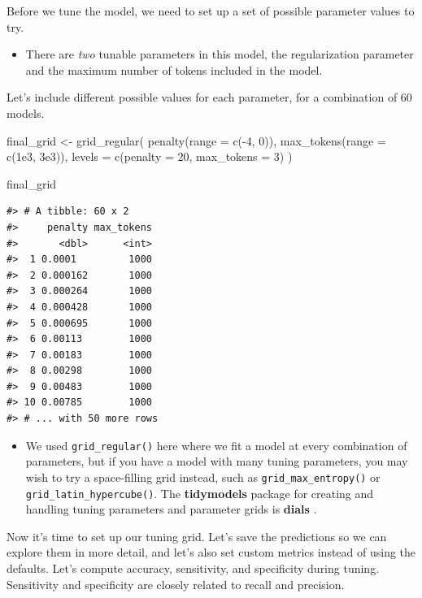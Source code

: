 \documentclass[
]{krantz}
\makeatletter
\newenvironment{Shaded}{\begin{snugshade}}{\end{snugshade}}
\newcommand{\AttributeTok}[1]{\textcolor[rgb]{0.77,0.63,0.00}{#1}}
\newcommand{\DecValTok}[1]{\textcolor[rgb]{0.00,0.00,0.81}{#1}}
\newcommand{\FloatTok}[1]{\textcolor[rgb]{0.00,0.00,0.81}{#1}}
\newcommand{\FunctionTok}[1]{\textcolor[rgb]{0.00,0.00,0.00}{#1}}
\newcommand{\NormalTok}[1]{#1}
\newcommand{\OtherTok}[1]{\textcolor[rgb]{0.56,0.35,0.01}{#1}}
\newcommand{\SpecialCharTok}[1]{\textcolor[rgb]{0.00,0.00,0.00}{#1}}
\newenvironment{kframe}{%
\medskip{}
\setlength{\fboxsep}{.8em}
 \def\at@end@of@kframe{}%
 \ifinner\ifhmode%
  \def\at@end@of@kframe{\end{minipage}}%
  \begin{minipage}{\columnwidth}%
 \fi\fi%
 \def\FrameCommand##1{\hskip\@totalleftmargin \hskip-\fboxsep
 \colorbox{shadecolor}{##1}\hskip-\fboxsep
     \hskip-\linewidth \hskip-\@totalleftmargin \hskip\columnwidth}%
 \MakeFramed {\advance\hsize-\width
   \@totalleftmargin\z@ \linewidth\hsize
   \@setminipage}}%
 {\par\unskip\endMakeFramed%
 \at@end@of@kframe}
\renewenvironment{Shaded}{\begin{kframe}}{\end{kframe}}
\newenvironment{rmdblock}[1]
  {\begin{shaded*}
  \begin{itemize}[left = -1cm, labelsep = 1cm]
  \renewcommand{\labelitemi}{
    \raisebox{-.7\height}[0pt][0pt]{
      {\setkeys{Gin}{width=3em,keepaspectratio}\texttt{[image: images/\#1]}}
    }
  }
 
  \item
  }
  {
  \end{itemize}
  \end{shaded*}
  }
\newenvironment{rmdwarning}
  {\begin{rmdblock}{warning}}
  {\end{rmdblock}}
\newenvironment{rmdpackage}
  {\begin{rmdblock}{package}}
  {\end{rmdblock}}
\makeatother
\begin{document}
Before we tune the model, we need to set up a set of possible parameter values to try.

\begin{rmdwarning}
There are \emph{two} tunable parameters in this model, the
regularization parameter and the maximum number of tokens included in
the model.
\end{rmdwarning}

Let's include different possible values for each parameter, for a combination of 60 models.

\begin{Shaded}
\begin{Highlighting}[]
\NormalTok{final\_grid }\OtherTok{\textless{}{-}} \FunctionTok{grid\_regular}\NormalTok{(}
  \FunctionTok{penalty}\NormalTok{(}\AttributeTok{range =} \FunctionTok{c}\NormalTok{(}\SpecialCharTok{{-}}\DecValTok{4}\NormalTok{, }\DecValTok{0}\NormalTok{)),}
  \FunctionTok{max\_tokens}\NormalTok{(}\AttributeTok{range =} \FunctionTok{c}\NormalTok{(}\FloatTok{1e3}\NormalTok{, }\FloatTok{3e3}\NormalTok{)),}
  \AttributeTok{levels =} \FunctionTok{c}\NormalTok{(}\AttributeTok{penalty =} \DecValTok{20}\NormalTok{, }\AttributeTok{max\_tokens =} \DecValTok{3}\NormalTok{)}
\NormalTok{)}

\NormalTok{final\_grid}
\end{Highlighting}
\end{Shaded}

\begin{verbatim}
#> # A tibble: 60 x 2
#>     penalty max_tokens
#>       <dbl>      <int>
#>  1 0.0001         1000
#>  2 0.000162       1000
#>  3 0.000264       1000
#>  4 0.000428       1000
#>  5 0.000695       1000
#>  6 0.00113        1000
#>  7 0.00183        1000
#>  8 0.00298        1000
#>  9 0.00483        1000
#> 10 0.00785        1000
#> # ... with 50 more rows
\end{verbatim}

\begin{rmdpackage}
We used \texttt{grid\_regular()} here where we fit a model at every combination of parameters, but if you have a model with many tuning parameters, you may wish to try a space-filling grid instead, such as \texttt{grid\_max\_entropy()} or \texttt{grid\_latin\_hypercube()}. The \textbf{tidymodels} package for creating and handling tuning parameters and parameter grids is \textbf{dials} \citep{R-dials}.
\end{rmdpackage}

Now it's time to set up our tuning grid. Let's save the predictions so we can explore them in more detail, and let's also set custom metrics instead of using the defaults. Let's compute accuracy, sensitivity, and specificity during tuning. Sensitivity and specificity are closely related to recall and precision.
\end{document}
